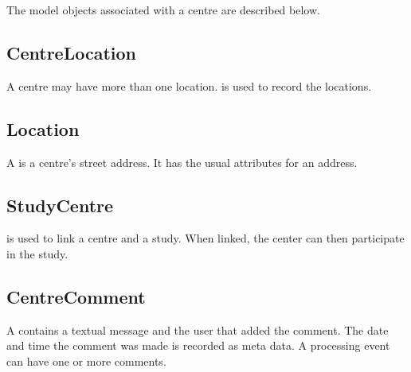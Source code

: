 The model objects associated with a centre are described below.

\subsection*{CentreLocation}
A centre may have more than one location.  is used
to record the locations.

\subsection*{Location}
A  is a centre's street address. It has the usual
attributes for an address.

\subsection*{StudyCentre}
 is used to link a centre and a study. When linked, the
center can then participate in the study.

\subsection*{CentreComment}
A  contains a textual message and the
user that added the comment. The date and time the comment was made is recorded
as meta data. A processing event can have one or more comments.

